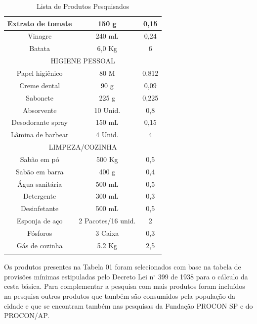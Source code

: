 \documentclass{ifto-tex}
\begin{document}
\begin{longtable}{|c|c|c|}
			\hline
			Extrato de tomate & 150 g              & 0,15            \\
			\hline
			Vinagre           & 240 mL             & 0,24            \\
			\hline
			Batata            & 6,0 Kg             & 6               \\
			\hline
			\multicolumn{3}{|c|}{HIGIENE PESSOAL}                      \\
			\hline
			Papel higiênico   & 80 M               & 0,812           \\
			\hline
			Creme dental      & 90 g               & 0,09            \\
			\hline
			Sabonete          & 225 g              & 0,225           \\
			\hline
			Absorvente        & 10 Unid.           & 0,8             \\
			\hline
			Desodorante spray & 150 mL             & 0,15            \\
			\hline
			Lâmina de barbear & 4 Unid.            & 4               \\
			\hline
			\multicolumn{3}{|c|}{LIMPEZA/COZINHA}                      \\
			\hline
			Sabão em pó       & 500 Kg             & 0,5             \\
			\hline
			Sabão em barra    & 400 g              & 0,4             \\
			\hline
			Água sanitária    & 500 mL             & 0,5             \\
			\hline
			Detergente        & 300 mL             & 0,3             \\
			\hline
			Desinfetante      & 500 mL             & 0,5             \\
			\hline
			Esponja de aço    & 2 Pacotes/16 unid. & 2               \\
			\hline
			Fósforos          & 3 Caixa            & 0,3             \\
			\hline
			Gás de cozinha    & 5.2 Kg             & 2,5       \\
			\hline     
	\caption{Lista de Produtos Pesquisados}
	\end{longtable}
	
Os produtos presentes na Tabela 01 foram selecionados com base na tabela de provisões mínimas estipuladas pelo Decreto Lei n$^{\circ}$ 399 de 1938 para o cálculo da cesta básica. Para complementar a pesquisa com mais produtos foram incluídos na pesquisa outros produtos que também são consumidos pela população da cidade e que se encontram também nas pesquisas da Fundação PROCON SP e do PROCON/AP.
\end{document}
